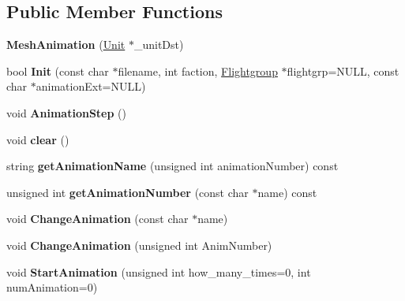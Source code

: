 \subsection*{Public Member Functions}
\begin{DoxyCompactItemize}
\item 
{\bfseries Mesh\+Animation} (\hyperlink{classUnit}{Unit} $\ast$\+\_\+unit\+Dst)\hypertarget{classMeshAnimation_a4d2fd7576765b1cdc126c61fc0feba0c}{}\label{classMeshAnimation_a4d2fd7576765b1cdc126c61fc0feba0c}

\item 
bool {\bfseries Init} (const char $\ast$filename, int faction, \hyperlink{classFlightgroup}{Flightgroup} $\ast$flightgrp=N\+U\+LL, const char $\ast$animation\+Ext=N\+U\+LL)\hypertarget{classMeshAnimation_aede48e11690cbbef28f9a6ded05ce856}{}\label{classMeshAnimation_aede48e11690cbbef28f9a6ded05ce856}

\item 
void {\bfseries Animation\+Step} ()\hypertarget{classMeshAnimation_a730850e10db6f063ba5ca090ea2e462e}{}\label{classMeshAnimation_a730850e10db6f063ba5ca090ea2e462e}

\item 
void {\bfseries clear} ()\hypertarget{classMeshAnimation_a090db9b8127c6207038e06d67c80c26f}{}\label{classMeshAnimation_a090db9b8127c6207038e06d67c80c26f}

\item 
string {\bfseries get\+Animation\+Name} (unsigned int animation\+Number) const \hypertarget{classMeshAnimation_a15fc528d68a0a519e38cbb9cc7b7e1db}{}\label{classMeshAnimation_a15fc528d68a0a519e38cbb9cc7b7e1db}

\item 
unsigned int {\bfseries get\+Animation\+Number} (const char $\ast$name) const \hypertarget{classMeshAnimation_ad2e8354c66ee48c3e185b885b788eae5}{}\label{classMeshAnimation_ad2e8354c66ee48c3e185b885b788eae5}

\item 
void {\bfseries Change\+Animation} (const char $\ast$name)\hypertarget{classMeshAnimation_a125024ca229cf6f557f05e6fc7c088f0}{}\label{classMeshAnimation_a125024ca229cf6f557f05e6fc7c088f0}

\item 
void {\bfseries Change\+Animation} (unsigned int Anim\+Number)\hypertarget{classMeshAnimation_aff784a934d786bbe75f988e14cd63caa}{}\label{classMeshAnimation_aff784a934d786bbe75f988e14cd63caa}

\item 
void {\bfseries Start\+Animation} (unsigned int how\+\_\+many\+\_\+times=0, int num\+Animation=0)\hypertarget{classMeshAnimation_a967a1f5a4846b521d72077a9e7e305ab}{}\label{classMeshAnimation_a967a1f5a4846b521d72077a9e7e305ab}


\end{DoxyCompactItemize}
